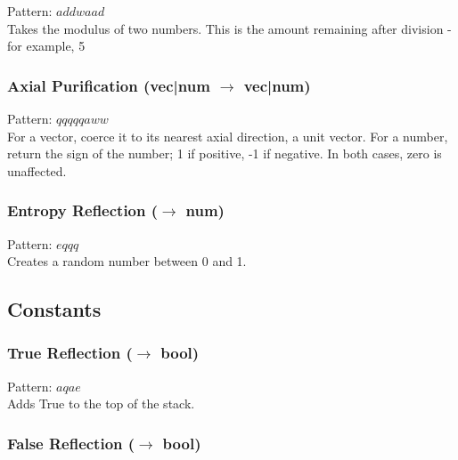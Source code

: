 \documentclass[12pt]{article}
\begin{document}
    Pattern: $addwaad$\\
      Takes the modulus of two numbers. This is the amount remaining after division - for example, 5 %


  \label{sec: patterns/math@hexcasting:coerce_axial}
\subsubsection*{Axial Purification (vec|num $\rightarrow$ vec|num)}

    Pattern: $qqqqqaww$\\
      For a vector, coerce it to its nearest axial direction, a unit vector. For a number, return the sign of the number; 1 if positive, -1 if negative. In both cases, zero is unaffected.\\


  \label{sec: patterns/math@hexcasting:random}
\subsubsection*{Entropy Reflection ($\rightarrow$ num)}

    Pattern: $eqqq$\\
      Creates a random number between 0 and 1.\\

\newpage

\label{sec:patterns/consts}
\subsection*{Constants}


  \label{sec: patterns/consts@hexcasting:const/true}
\subsubsection*{True Reflection ($\rightarrow$ bool)}

    Pattern: $aqae$\\
      Adds True to the top of the stack.\\


  \label{sec: patterns/consts@hexcasting:const/false}
\subsubsection*{False Reflection ($\rightarrow$ bool)}
\end{document}
